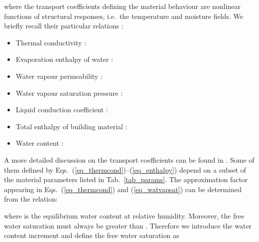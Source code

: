 \documentclass[preprint,12pt]{elsarticle}
\begin{document}
where the transport coefficients defining the material behaviour are
nonlinear functions of structural responses, i.e.\ the temperature
 and moisture  fields. We
briefly recall their particular relations \cite{Kunzel:1997}:
\begin{itemize}
\item
Thermal conductivity :

\item
Evaporation enthalpy of water :

\item Water vapour permeability
:

\item Water vapour saturation pressure :

\item
Liquid conduction coefficient :

\item
Total enthalpy of building material :

\item
Water content :

\end{itemize}
A more detailed discussion on the transport coefficients can be found in
\cite{Kunzel:1997, Cerny:2009:CMEM}. Some of them
defined by Eqs.~(\ref{eq_thermcond})--(\ref{eq_enthalpy}) depend on
a subset of the material parameters listed in Tab.~\ref{tab_params}.
The approximation factor  appearing in Eqs.~(\ref{eq_thermcond})
and (\ref{eq_watvapsat}) can be determined from the relation:

where  is the equilibrium water content at 
relative humidity. Moreover, the free water saturation  must
always be greater than . Therefore we introduce the water content
increment  and define the free water saturation
as
\end{document}
